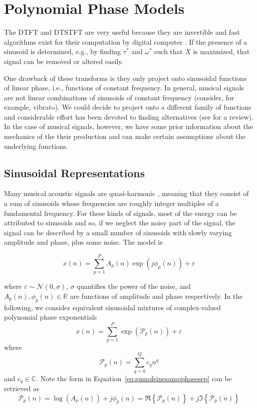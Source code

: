 \section{Polynomial Phase Models\label{sec:polynomphasemodel}}

The DTFT and DTSTFT are very useful because they are invertible
\cite{portnoff1976implementation} and fast algorithms exist for their 
computation by digital computer \cite{van1992computational}. If the presence of
a sinusoid is determined, e.g., by finding $\tau^{\ast}$ and $\omega^{\ast}$ such that
$X$ is maximized, that signal can be removed or altered easily.

One drawback of these transforms is they only project onto sinusoidal functions
of linear phase, i.e., functions of constant frequency. In general, musical
signals are not linear combinations of sinusoids of constant frequency
(consider, for example, vibrato). We could decide to project onto a different
family of functions and considerable effort has been devoted to finding
alternatives (see \cite{kereliuk2011sparse} for a review). In the case of
musical signals, however, we have some prior information about the mechanics of
the their production and can make certain assumptions about the underlying
functions.

\subsection{Sinusoidal Representations\label{sec:mqfmfromphase}} Many musical
acoustic signals are quasi-harmonic \cite{fletcher2012physics}, meaning that
they consist of a sum of sinusoids whose frequencies are roughly integer
multiples of a fundamental frequency. For these kinds of signals, most of the
energy can be attributed to sinusoids and so, if we neglect the noisy part of
the signal, the signal can be described by a small number of sinusoids with
slowly varying amplitude and phase, plus some noise. The model is

\begin{equation}
    \label{eq:sumofsinesampphasesep}
    x(n)=\sum_{p=1}^{P} A_p(n) \exp(j \phi_p(n)) + \varepsilon
\end{equation}

where $\varepsilon \sim \mathcal{N}(0,\sigma)$, $\sigma$ quantifies the power of
the noise, and $A_{p}(n),\phi_{p}(n) \in \mathbb{R}$ are functions of amplitude and
phase respectively. In the following, we consider equivalent sinusoidal mixtures
of complex-valued polynomial phase exponentials
\begin{equation}
    x(n)=\sum_{p=1}^{P} \exp(\mathcal{P}_p(n)) + \varepsilon
\end{equation}
where
\begin{equation}
    \mathcal{P}_p(n) = \sum_{q=0}^{Q} c_q n^{q}
\end{equation}
and $c_q \in \mathbb{C}$. Note the form in
Equation~\ref{eq:sumofsinesampphasesep} can be retrieved as
\[
    \mathcal{P}_p(n) = \log(A_p(n)) +  j \phi_p(n) =
    \Re\left\{\mathcal{P}_p(n)\right\} +
    j\Im\left\{\mathcal{P}_p(n)\right\}
\]

